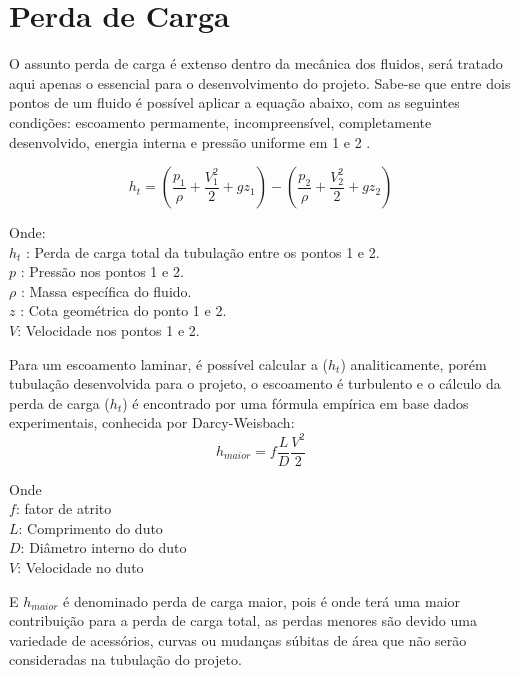 \section{Perda de Carga}

    O assunto perda de carga é extenso dentro da mecânica dos fluidos, será tratado aqui apenas o essencial para o desenvolvimento do projeto. Sabe-se que entre dois pontos de um fluido é possível aplicar a equação abaixo, com as seguintes condições: escoamento permamente, incompreensível, completamente desenvolvido, energia interna e pressão uniforme em 1 e 2 \cite{fox}.

    \begin{equation} \label{eq-perda_de_carga}
        h_t = \left( \frac{p_1}{\rho} + \frac{V^2_1}{2} + gz_1 \right)- \left( \frac{p_2}{\rho} + \frac{V^2_2}{2} + gz_2 \right)
    \end{equation}

\noindent
    Onde: \\
    $h_t$ : Perda de carga total da tubulação entre os pontos 1 e 2. \\
    $p$   : Pressão nos pontos 1 e 2. \\
    $\rho$ : Massa específica do fluido. \\
    $z$ : Cota geométrica do ponto 1 e 2. \\
    $V$: Velocidade nos pontos 1 e 2.


    Para um escoamento laminar, é possível calcular a ($h_t$) analiticamente, porém tubulação desenvolvida para o projeto, o escoamento é turbulento e o cálculo da perda de carga ($h_t$) é encontrado por uma fórmula empírica em base dados experimentais, conhecida por Darcy-Weisbach:
    \begin{equation} \label{eq-darcy}
        h_{maior} = f \frac{L}{D} \frac{V^2}{2}
    \end{equation}

    \noindent
    Onde \\
    $f$: fator de atrito \\
    $L$: Comprimento do duto \\
    $D$: Diâmetro interno do duto \\
    $V$: Velocidade no duto

    E $h_{maior}$ é denominado perda de carga maior, pois é onde terá uma maior contribuição para a perda de carga total, as perdas menores são devido uma variedade de acessórios, curvas ou mudanças súbitas de área \cite{fox} que não serão consideradas na tubulação do projeto.

